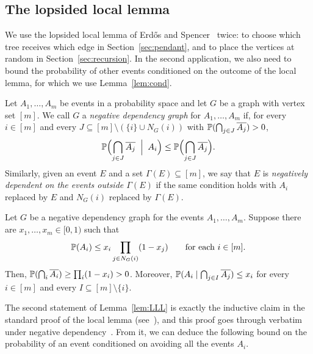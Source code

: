 \subsection{The lopsided local lemma}\label{sec:LLL}
We use the lopsided local lemma of Erd\H{o}s and Spencer~\cite{ES} twice: to choose which tree receives which edge in Section~\ref{sec:pendant}, and to place the vertices at random in Section~\ref{sec:recursion}.
In the second application, we also need to bound the probability of other events conditioned on the outcome of the local lemma, for which we use Lemma~\ref{lem:cond}.

\begin{definition}
Let $A_1,\dots,A_m$ be events in a probability space and let $G$ be a graph with vertex set $[m]$. We call $G$ a \emph{negative dependency graph} for $A_1,\ldots,A_m$ if, for every $i\in [m]$ and every $J\subseteq[m]\setminus(\{i\}\cup N_G(i))$ with $\mathbb{P}(\bigcap_{j\in J}\overline{A_j})>0$,
\[\mathbb{P}\Bigl(\bigcap_{j\in J}\overline{A_j}\;\Bigm|\;A_i\Bigr)\le\mathbb{P}\Bigl(\bigcap_{j\in J}\overline{A_j}\Bigr).\]
Similarly, given an event $E$ and a set $\Gamma(E)\subseteq[m]$, we say that $E$ is \emph{negatively dependent on the events outside $\Gamma(E)$} if the same condition holds with $A_i$ replaced by $E$ and $N_G(i)$ replaced by $\Gamma(E)$.
\end{definition}

\begin{lemma}\label{lem:LLL}
Let $G$ be a negative dependency graph for the events $A_1,\dots,A_m$. Suppose there are $x_1,\dots,x_m\in[0,1)$ such that
\[\mathbb{P}(A_i)\le x_i\prod_{j\in N_G(i)}(1-x_j)\qquad\text{for each }i\in[m].\]
Then, $\mathbb{P}(\bigcap_i\overline{A_i})\ge\prod_i(1-x_i)>0$. Moreover, $\mathbb{P}(A_i\mid\bigcap_{j\in I}\overline{A_j})\le x_i$ for every $i\in [m]$ and every $I\subseteq[m]\setminus\{i\}$.
\end{lemma}

The second statement of Lemma~\ref{lem:LLL} is exactly the inductive claim in the standard proof of the local lemma (see~\cite[Lemma 5.1.1]{AS}), and this proof goes through verbatim under negative dependency~\cite{ES}.
From it, we can deduce the following bound on the probability of an event conditioned on avoiding all the events $A_i$.

